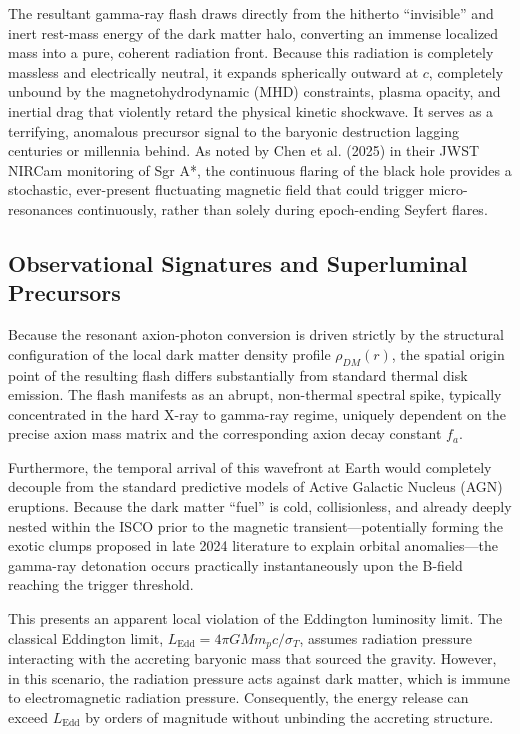 \documentclass[12pt,a4paper]{article}
\begin{document}
The resultant gamma-ray flash draws directly from the hitherto ``invisible'' and inert rest-mass energy of the dark matter halo, converting an immense localized mass into a pure, coherent radiation front. Because this radiation is completely massless and electrically neutral, it expands spherically outward at $c$, completely unbound by the magnetohydrodynamic (MHD) constraints, plasma opacity, and inertial drag that violently retard the physical kinetic shockwave. It serves as a terrifying, anomalous precursor signal to the baryonic destruction lagging centuries or millennia behind. As noted by Chen et al. (2025) in their JWST NIRCam monitoring of Sgr A*, the continuous flaring of the black hole provides a stochastic, ever-present fluctuating magnetic field that could trigger micro-resonances continuously, rather than solely during epoch-ending Seyfert flares.

\subsection{Observational Signatures and Superluminal Precursors}

Because the resonant axion-photon conversion is driven strictly by the structural configuration of the local dark matter density profile $\rho_{DM}(r)$, the spatial origin point of the resulting flash differs substantially from standard thermal disk emission. The flash manifests as an abrupt, non-thermal spectral spike, typically concentrated in the hard X-ray to gamma-ray regime, uniquely dependent on the precise axion mass matrix and the corresponding axion decay constant $f_a$.

Furthermore, the temporal arrival of this wavefront at Earth would completely decouple from the standard predictive models of Active Galactic Nucleus (AGN) eruptions. Because the dark matter ``fuel'' is cold, collisionless, and already deeply nested within the ISCO prior to the magnetic transient—potentially forming the exotic clumps proposed in late 2024 literature to explain orbital anomalies—the gamma-ray detonation occurs practically instantaneously upon the B-field reaching the trigger threshold. 

This presents an apparent local violation of the Eddington luminosity limit. The classical Eddington limit, $L_{\text{Edd}} = 4\pi G M m_p c / \sigma_T$, assumes radiation pressure interacting with the accreting baryonic mass that sourced the gravity. However, in this scenario, the radiation pressure acts against dark matter, which is immune to electromagnetic radiation pressure. Consequently, the energy release can exceed $L_{\text{Edd}}$ by orders of magnitude without unbinding the accreting structure.
\end{document}
